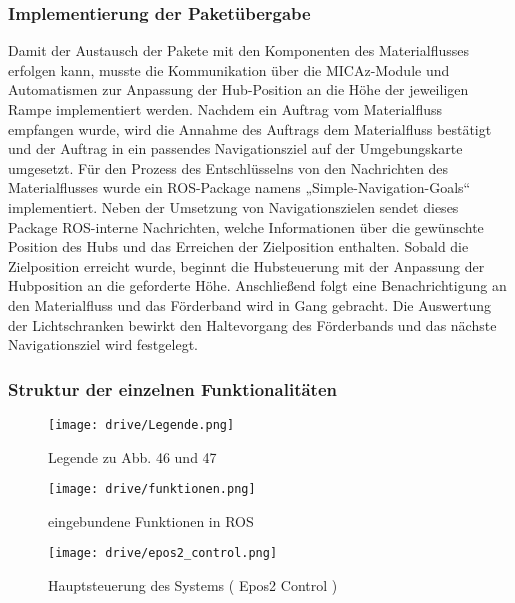 \subsubsection{Implementierung der Paketübergabe}
Damit der Austausch der Pakete mit den Komponenten des Materialflusses erfolgen kann, musste die Kommunikation über die MICAz-Module und Automatismen zur Anpassung der Hub-Position an die Höhe der jeweiligen Rampe implementiert werden. Nachdem ein Auftrag vom Materialfluss empfangen wurde, wird die Annahme des Auftrags dem Materialfluss bestätigt und der Auftrag  in ein passendes Navigationsziel auf der Umgebungskarte umgesetzt.  Für den Prozess des Entschlüsselns von den Nachrichten des Materialflusses wurde ein ROS-Package namens „Simple-Navigation-Goals“ implementiert. Neben der Umsetzung von Navigationszielen sendet dieses Package ROS-interne Nachrichten, welche Informationen über die gewünschte Position des Hubs und das Erreichen der Zielposition enthalten.
Sobald die Zielposition erreicht wurde, beginnt die Hubsteuerung mit der Anpassung der Hubposition an die geforderte Höhe. Anschließend folgt eine Benachrichtigung an den Materialfluss und das Förderband wird in Gang gebracht. Die Auswertung der Lichtschranken bewirkt den Haltevorgang des Förderbands und das nächste Navigationsziel wird festgelegt.

\subsubsection{Struktur der einzelnen Funktionalitäten}



\begin{figure}[h!]
 \centering
		\texttt{[image: drive/Legende.png]}
	\caption{Legende zu Abb. 46 und 47}
	\label{fig:Legende}
\end{figure}

\begin{figure}[h!]
 \centering
		\texttt{[image: drive/funktionen.png]}
	\caption{eingebundene Funktionen in ROS}
	\label{fig:funktionen}
\end{figure}

\begin{figure}[h!]
 \centering
		\texttt{[image: drive/epos2\_control.png]}
	\caption{Hauptsteuerung des Systems ( Epos2 Control )}
	\label{fig:epos2_control}
\end{figure}
